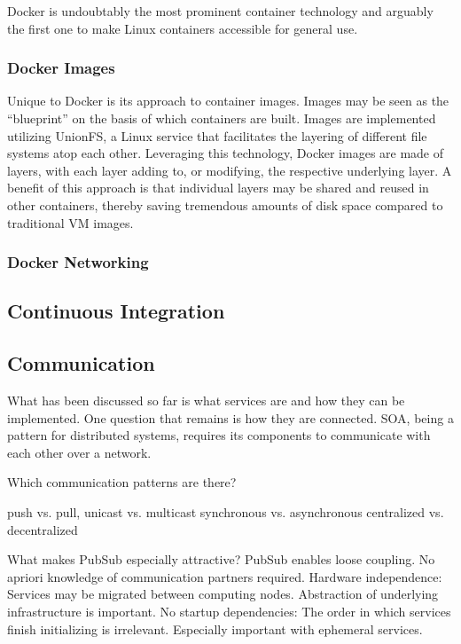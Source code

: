 Docker \cite{DockerWebsite} is undoubtably the most prominent container technology and arguably the first one to make Linux containers accessible for general use. 

\subsubsection{Docker Images}
Unique to Docker is its approach to container images. Images may be seen as the ``blueprint'' on the basis of which containers are built. 
Images are implemented utilizing UnionFS, a Linux service that facilitates the layering of different file systems atop each other. 
Leveraging this technology, Docker images are made of layers, with each layer adding to, or modifying, the respective underlying layer. 
A benefit of this approach is that individual layers may be shared and reused in other containers, thereby saving tremendous amounts of disk space compared to traditional VM images.

\subsubsection{Docker Networking}

\subsection{Continuous Integration}



\subsection{Communication}

What has been discussed so far is what services are and how they can be implemented. One question that remains is how they are connected. SOA, being a pattern for distributed systems, requires its components to communicate with each other over a network.

Which communication patterns are there?

push vs. pull,
unicast vs. multicast
synchronous vs. asynchronous
centralized vs. decentralized

What makes PubSub especially attractive?
PubSub enables loose coupling. No apriori knowledge of communication partners required. Hardware independence: Services may be migrated between computing nodes. Abstraction of underlying infrastructure is important.
No startup dependencies: The order in which services finish initializing is irrelevant. Especially important with ephemeral services.


